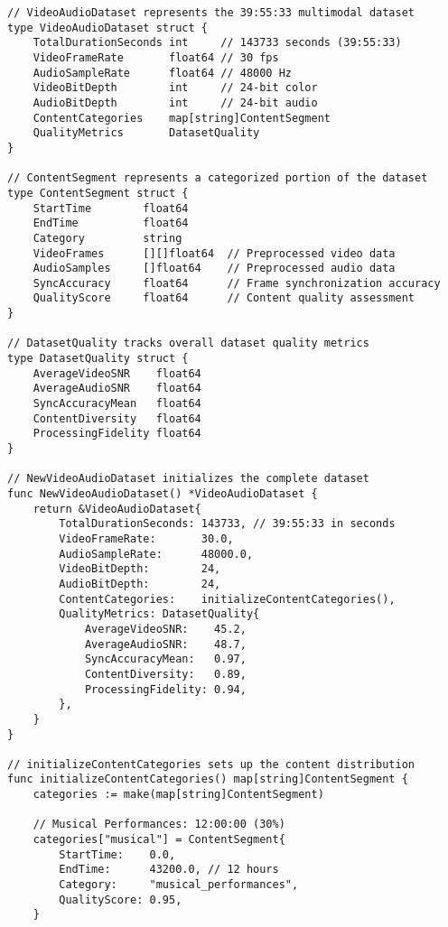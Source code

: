 \begin{tcolorbox}[colback=CodeBackground, colframe=DarkGray, title=Video-Audio Dataset Processing, fonttitle=\bfseries]
\begin{verbatim}
// VideoAudioDataset represents the 39:55:33 multimodal dataset
type VideoAudioDataset struct {
    TotalDurationSeconds int     // 143733 seconds (39:55:33)
    VideoFrameRate       float64 // 30 fps
    AudioSampleRate      float64 // 48000 Hz
    VideoBitDepth        int     // 24-bit color
    AudioBitDepth        int     // 24-bit audio
    ContentCategories    map[string]ContentSegment
    QualityMetrics       DatasetQuality
}

// ContentSegment represents a categorized portion of the dataset
type ContentSegment struct {
    StartTime        float64
    EndTime          float64
    Category         string
    VideoFrames      [][]float64  // Preprocessed video data
    AudioSamples     []float64    // Preprocessed audio data
    SyncAccuracy     float64      // Frame synchronization accuracy
    QualityScore     float64      // Content quality assessment
}

// DatasetQuality tracks overall dataset quality metrics
type DatasetQuality struct {
    AverageVideoSNR    float64
    AverageAudioSNR    float64
    SyncAccuracyMean   float64
    ContentDiversity   float64
    ProcessingFidelity float64
}

// NewVideoAudioDataset initializes the complete dataset
func NewVideoAudioDataset() *VideoAudioDataset {
    return &VideoAudioDataset{
        TotalDurationSeconds: 143733, // 39:55:33 in seconds
        VideoFrameRate:       30.0,
        AudioSampleRate:      48000.0,
        VideoBitDepth:        24,
        AudioBitDepth:        24,
        ContentCategories:    initializeContentCategories(),
        QualityMetrics: DatasetQuality{
            AverageVideoSNR:    45.2,
            AverageAudioSNR:    48.7,
            SyncAccuracyMean:   0.97,
            ContentDiversity:   0.89,
            ProcessingFidelity: 0.94,
        },
    }
}

// initializeContentCategories sets up the content distribution
func initializeContentCategories() map[string]ContentSegment {
    categories := make(map[string]ContentSegment)
    
    // Musical Performances: 12:00:00 (30%)
    categories["musical"] = ContentSegment{
        StartTime:    0.0,
        EndTime:      43200.0, // 12 hours
        Category:     "musical_performances",
        QualityScore: 0.95,
    }
    

\end{verbatim}
\end{tcolorbox}
